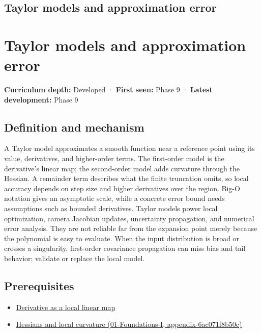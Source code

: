 \hypertarget{appendix-32f39e9a3738}{}
\section*{Taylor models and approximation error}
\chapter{Taylor models and approximation error}\label{appendix-32f39e9a3738-taylor-models-and-approximation-error}

\textbf{Curriculum depth:} Developed · \textbf{First seen:} Phase 9 · \textbf{Latest development:} Phase 9

\section{Definition and mechanism}\label{appendix-32f39e9a3738-definition-and-mechanism}

A Taylor model approximates a smooth function near a reference point using its value, derivatives, and higher-order terms. The first-order model is the derivative's linear map; the second-order model adds curvature through the Hessian. A remainder term describes what the finite truncation omits, so local accuracy depends on step size and higher derivatives over the region. Big-O notation gives an asymptotic scale, while a concrete error bound needs assumptions such as bounded derivatives. Taylor models power local optimization, camera Jacobian updates, uncertainty propagation, and numerical error analysis. They are not reliable far from the expansion point merely because the polynomial is easy to evaluate. When the input distribution is broad or crosses a singularity, first-order covariance propagation can miss bias and tail behavior; validate or replace the local model.

\section{Prerequisites}\label{appendix-32f39e9a3738-prerequisites}

\begin{itemize}
\tightlist
\item
  \hyperref[appendix-7bc181935c42]{Derivative as a local linear map}
\item
  \href{../01-Foundations-I/main.pdf\#nameddest=appendix-6ac071f8b50c}{Hessians and local curvature (01-Foundations-I, appendix-6ac071f8b50c)}
\end{itemize}


